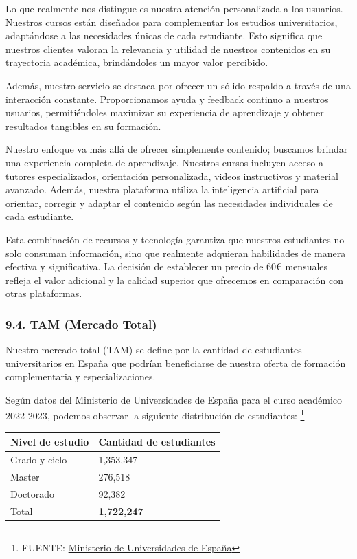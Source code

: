 \documentclass[
]{article}
\begin{document}
Lo que realmente nos distingue es nuestra atención personalizada a los
usuarios. Nuestros cursos están diseñados para complementar los estudios
universitarios, adaptándose a las necesidades únicas de cada estudiante.
Esto significa que nuestros clientes valoran la relevancia y utilidad de
nuestros contenidos en su trayectoria académica, brindándoles un mayor
valor percibido.

Además, nuestro servicio se destaca por ofrecer un sólido respaldo a
través de una interacción constante. Proporcionamos ayuda y feedback
continuo a nuestros usuarios, permitiéndoles maximizar su experiencia de
aprendizaje y obtener resultados tangibles en su formación.

Nuestro enfoque va más allá de ofrecer simplemente contenido; buscamos
brindar una experiencia completa de aprendizaje. Nuestros cursos
incluyen acceso a tutores especializados, orientación personalizada,
videos instructivos y material avanzado. Además, nuestra plataforma
utiliza la inteligencia artificial para orientar, corregir y adaptar el
contenido según las necesidades individuales de cada estudiante.

Esta combinación de recursos y tecnología garantiza que nuestros
estudiantes no solo consuman información, sino que realmente adquieran
habilidades de manera efectiva y significativa. La decisión de
establecer un precio de 60€ mensuales refleja el valor adicional y la
calidad superior que ofrecemos en comparación con otras plataformas.

\subsubsection{9.4. TAM (Mercado Total)}\label{tam-mercado-total}

Nuestro mercado total (TAM) se define por la cantidad de estudiantes
universitarios en España que podrían beneficiarse de nuestra oferta de
formación complementaria y especializaciones.

Según datos del Ministerio de Universidades de España para el curso
académico 2022-2023, podemos observar la siguiente distribución de
estudiantes: \footnote{FUENTE:
  \href{https://www.universidades.gob.es/wp-content/uploads/2023/06/Principales-resultados_EEU_2022-23.pdf}{Ministerio
  de Universidades de España}}

\begin{longtable}[]{@{}ll@{}}
\toprule\noalign{}
Nivel de estudio & Cantidad de estudiantes \\
\midrule\noalign{}
\endhead
\bottomrule\noalign{}
\endlastfoot
Grado y ciclo & 1,353,347 \\
Master & 276,518 \\
Doctorado & 92,382 \\
Total & \textbf{1,722,247} \\
\end{longtable}
\end{document}
